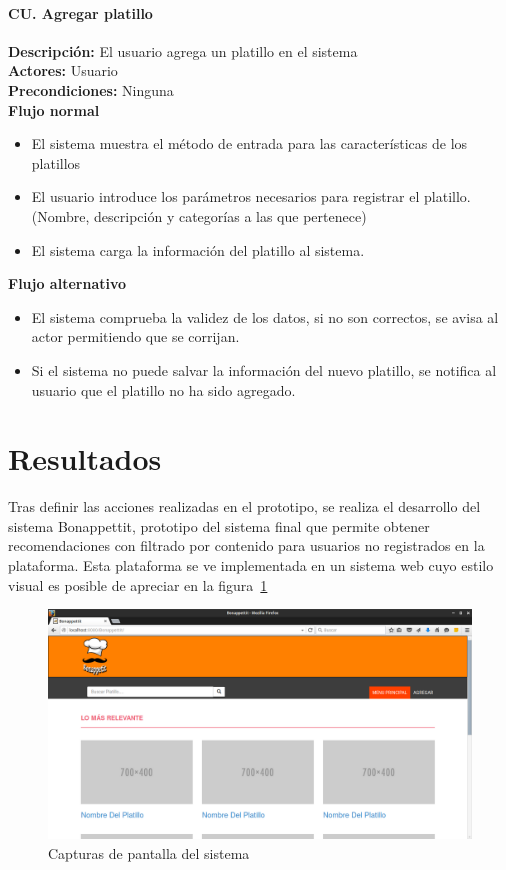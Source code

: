     \paragraph{CU. Agregar platillo\\}
    \textbf{Descripción:} El usuario agrega un platillo en el sistema\\
    \textbf{Actores:} Usuario\\
    \textbf{Precondiciones:} Ninguna\\
    \textbf{Flujo normal}\\
    \begin{itemize}
      \item El sistema muestra el método de entrada para las características de los platillos
      \item El usuario introduce los parámetros necesarios para registrar el platillo. (Nombre, descripción y categorías a las que pertenece)
      \item El sistema carga la información del platillo al sistema.
    \end{itemize}
    \textbf{Flujo alternativo}\\
    \begin{itemize}
      \item El sistema comprueba la validez de los datos, si no son correctos, se avisa al actor permitiendo que se corrijan. 
      \item Si el sistema no puede salvar la información del nuevo platillo, se notifica al usuario que el platillo no ha sido agregado.
    \end{itemize}
    
  \section{Resultados}
    Tras definir las acciones realizadas en el prototipo, se realiza el desarrollo del sistema Bonappettit, prototipo del sistema final que permite obtener recomendaciones con filtrado por contenido para usuarios no registrados en la plataforma. Esta plataforma se ve implementada en un sistema web cuyo estilo visual es posible de apreciar en la figura~\ref{fig: screenshot1 p2}
        \begin{figure}[h!]
          \centering
          \includegraphics[width=16cm]{./images/bonappettit.png}
          \caption{Capturas de pantalla del sistema}
          \label{fig: screenshot1 p2}
        \end{figure}

